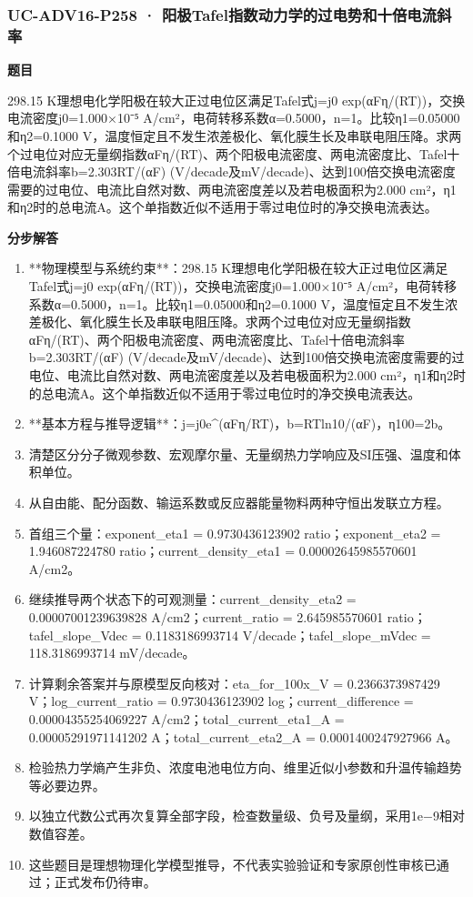 \documentclass[UTF8,11pt,a4paper]{ctexart}
\begin{document}
\subsubsection*{UC-ADV16-P258 · 阳极Tafel指数动力学的过电势和十倍电流斜率}
\noindent\textbf{题目}\par
298.15 K理想电化学阳极在较大正过电位区满足Tafel式j=j0 exp(αFη/(RT))，交换电流密度j0=1.000×10⁻⁵ A/cm²，电荷转移系数α=0.5000，n=1。比较η1=0.05000和η2=0.1000 V，温度恒定且不发生浓差极化、氧化膜生长及串联电阻压降。求两个过电位对应无量纲指数αFη/(RT)、两个阳极电流密度、两电流密度比、Tafel十倍电流斜率b=2.303RT/(αF) (V/decade及mV/decade)、达到100倍交换电流密度需要的过电位、电流比自然对数、两电流密度差以及若电极面积为2.000 cm²，η1和η2时的总电流A。这个单指数近似不适用于零过电位时的净交换电流表达。\par
\medskip\noindent\textbf{分步解答}
\begin{enumerate}
\item **物理模型与系统约束**：298.15 K理想电化学阳极在较大正过电位区满足Tafel式j=j0 exp(αFη/(RT))，交换电流密度j0=1.000×10⁻⁵ A/cm²，电荷转移系数α=0.5000，n=1。比较η1=0.05000和η2=0.1000 V，温度恒定且不发生浓差极化、氧化膜生长及串联电阻压降。求两个过电位对应无量纲指数αFη/(RT)、两个阳极电流密度、两电流密度比、Tafel十倍电流斜率b=2.303RT/(αF) (V/decade及mV/decade)、达到100倍交换电流密度需要的过电位、电流比自然对数、两电流密度差以及若电极面积为2.000 cm²，η1和η2时的总电流A。这个单指数近似不适用于零过电位时的净交换电流表达。
\item **基本方程与推导逻辑**：j=j0e\textasciicircum{}(αFη/RT)，b=RTln10/(αF)，η100=2b。
\item 清楚区分分子微观参数、宏观摩尔量、无量纲热力学响应及SI压强、温度和体积单位。
\item 从自由能、配分函数、输运系数或反应器能量物料两种守恒出发联立方程。
\item 首组三个量：exponent\_eta1 = 0.9730436123902 ratio；exponent\_eta2 = 1.946087224780 ratio；current\_density\_eta1 = 0.00002645985570601 A/cm2。
\item 继续推导两个状态下的可观测量：current\_density\_eta2 = 0.00007001239639828 A/cm2；current\_ratio = 2.645985570601 ratio；tafel\_slope\_Vdec = 0.1183186993714 V/decade；tafel\_slope\_mVdec = 118.3186993714 mV/decade。
\item 计算剩余答案并与原模型反向核对：eta\_for\_100x\_V = 0.2366373987429 V；log\_current\_ratio = 0.9730436123902 log；current\_difference = 0.00004355254069227 A/cm2；total\_current\_eta1\_A = 0.00005291971141202 A；total\_current\_eta2\_A = 0.0001400247927966 A。
\item 检验热力学熵产生非负、浓度电池电位方向、维里近似小参数和升温传输趋势等必要边界。
\item 以独立代数公式再次复算全部字段，检查数量级、负号及量纲，采用1e−9相对数值容差。
\item 这些题目是理想物理化学模型推导，不代表实验验证和专家原创性审核已通过；正式发布仍待审。
\end{enumerate}
\end{document}
